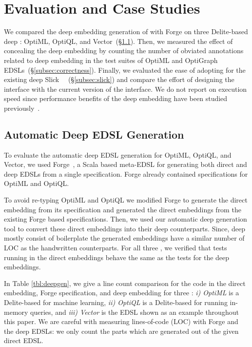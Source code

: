 \chapter{Evaluation and Case Studies}
\label{sec:ch2-evaluation}

We compared the deep embedding generation of \yy with Forge on three Delite-based
 deep \edsls: OptiML, OptiQL, and Vector~(\S \ref{subsec:eval-deepgen}).
Then, we measured the effect of concealing the deep embedding by counting the
number of obviated annotations related to deep embedding in the test suites of OptiML
and OptiGraph EDSLs~(\S \ref{subsec:correctness}). Finally, we evaluated the ease
of adopting \yy for the existing deep \edsl Slick~\cite{slick}
~(\S \ref{subsec:slick}) and compare the effort of designing the interface with
the current version of the interface. We do not report on execution speed since performance
benefits of the deep embedding have been studied previously~\cite{rompf_optimizing_2013,forge}.

\section{Automatic Deep EDSL Generation}
\label{subsec:eval-deepgen}

To evaluate the automatic deep EDSL generation for OptiML, OptiQL, and Vector,
we used Forge~\cite{forge}, a Scala based meta-EDSL for generating both direct
and deep EDSLs from a single specification. Forge already contained
specifications for OptiML and OptiQL.

To avoid re-typing OptiML and OptiQL we modified Forge to generate the direct
embedding from its specification and generated the direct embeddings
from the existing Forge based \edsl specifications. Then, we used our automatic deep
generation tool to convert these direct embeddings into their deep
counterparts. Since, deep \edsls mostly consist of boilerplate the generated
embeddings have a similar number of LOC as the handwritten counterparts. For all
three \edsls, we verified that tests running in the direct embeddings behave the
same as the tests for the deep embeddings.

In Table \ref{tbl:deepgen}, we give a line count comparison for the code in
the direct embedding, Forge specification, and deep embedding for three \edsls:
\emph{i) OptiML} is a Delite-based \edsl for machine learning,
\emph{ii) OptiQL} is a Delite-based \edsl for running in-memory queries, and
\emph{iii) Vector} is the EDSL shown as an example throughout this paper.
We are careful with measuring lines-of-code (LOC) with Forge and the deep EDSLs: we only
count the parts which are generated out of the given direct EDSL.


